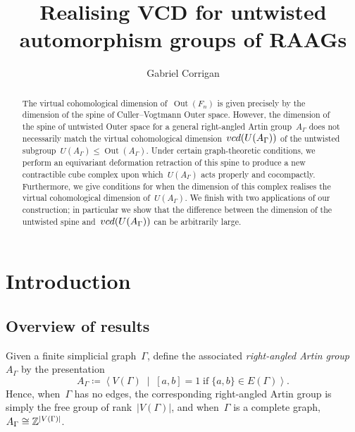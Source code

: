 \documentclass[11pt]{amsart}
\theoremstyle{definition}
\theoremstyle{definition}
\theoremstyle{definition}
\theoremstyle{definition}
\newcommand{\raag}{A_\Gamma} %
\begin{document}
 

\title{Realising VCD for untwisted automorphism groups of RAAGs}

\author{Gabriel Corrigan}
\address{School of Mathematics and Statistics, University of Glasgow, Glasgow, G12 8QQ, UK}

\begin{abstract}
    The virtual cohomological dimension of~$\operatorname{Out}(F_n)$ is given precisely by the dimension of the spine of Culler--Vogtmann Outer space. However, the dimension of the spine of untwisted Outer space for a general right-angled Artin group~$A_\Gamma$ does not necessarily match the virtual cohomological dimension~$\textsc{vcd}(U(A_{\Gamma}))$ of the untwisted subgroup~$U(A_\Gamma) \leq \operatorname{Out}(A_\Gamma)$. Under certain graph-theoretic conditions, we perform an equivariant deformation retraction of this spine to produce a new contractible cube complex upon which~$U(A_\Gamma)$ acts properly and cocompactly. Furthermore, we give conditions for when the dimension of this complex realises the virtual cohomological dimension of~$U(A_\Gamma)$. We finish with two applications of our construction; in particular we show that the difference between the dimension of the untwisted spine and~$\textsc{vcd}(U(A_{\Gamma}))$ can be arbitrarily large.
\end{abstract}

\maketitle

\tableofcontents

\section{Introduction}\label{sec:intro}

\subsection{Overview of results}\label{subsec:overview of results}

Given a finite simplicial graph~$\Gamma$, define the associated \emph{right-angled Artin group}~$\raag$ by the presentation
\[\raag \coloneqq \left\langle V(\Gamma) \;\;\vert\;\; [a, b] = 1 \; \text{if} \; \{a, b\} \in E(\Gamma) \right\rangle.\]
Hence, when~$\Gamma$ has no edges, the corresponding right-angled Artin group is simply the free group of rank~$|V(\Gamma)|$, and when~$\Gamma$ is a complete graph,~$\raag \cong \smash{\mathbb{Z}^{|V(\Gamma)|}}$.
\end{document}

